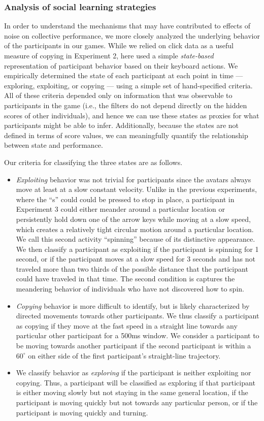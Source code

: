 \documentclass[12pt,letterpaper]{article}
\begin{document}
\subsubsection{Analysis of social learning strategies}

In order to understand the mechanisms that may have contributed to effects of noise on collective performance, we more closely analyzed the underlying behavior of the participants in our games.
While we relied on click data as a useful measure of copying in Experiment 2, here used a simple \emph{state-based} representation of participant behavior based on their keyboard actions.
We empirically determined the state of each participant at each point in time --- exploring, exploiting, or copying --- using a simple set of hand-specified criteria.
All of these criteria depended only on information that was observable to participants in the game (i.e., the filters do not depend directly on the hidden scores of other individuals), and hence we can use these states as proxies for what participants might be able to infer.
Additionally, because the states are not defined in terms of score values, we can meaningfully quantify the relationship between state and performance.

Our criteria for classifying the three states are as follows.
\begin{itemize}
\item \emph{Exploiting} behavior was not trivial for participants since the avatars always move at least at a slow constant velocity. 
Unlike in the previous experiments, where the ``s'' could could be pressed to stop in place, a participant in Experiment 3 could either meander around a particular location or persistently hold down one of the arrow keys while moving at a slow speed, which creates a relatively tight circular motion around a particular location.  
We call this second activity ``spinning'' because of its distinctive appearance.  
We then classify a participant as exploiting if the participant is spinning for 1 second, or if the participant moves at a slow speed for 3 seconds and has not traveled more than two thirds of the possible distance that the participant could have traveled in that time.
The second condition is captures the meandering behavior of individuals who have not discovered how to spin.
\item \emph{Copying} behavior is more difficult to identify, but is likely characterized by directed movements towards other participants. 
We thus classify a participant as copying if they move at the fast speed in a straight line towards any particular other participant for a 500ms window.
We consider a participant to be moving towards another participant if the second participant is within a $60^\circ$ on either side of the first participant's straight-line trajectory.
\item We classify behavior as \emph{exploring} if the participant is neither exploiting nor copying. Thus, a participant will be classified as exploring if that participant is either moving slowly but not staying in the same general location, if the participant is moving quickly but not towards any particular person, or if the participant is moving quickly and turning.
\end{itemize}
\end{document}
